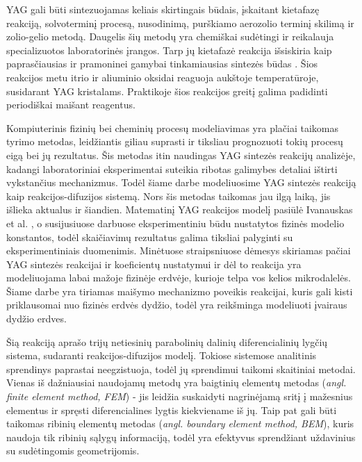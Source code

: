 \documentclass[]{VUMIFTemplateClass}
\begin{document}
YAG gali būti sintezuojamas keliais skirtingais būdais, įskaitant kietafazę reakciją, solvoterminį procesą, nusodinimą, purškiamo aerozolio terminį skilimą ir zolio-gelio metodą. Daugelis šių metodų yra chemiškai sudėtingi ir reikalauja specializuotos laboratorinės įrangos. Tarp jų kietafazė reakcija išsiskiria kaip paprasčiausias ir pramoninei gamybai tinkamiausias sintezės būdas \cite{zhangNovelSynthesisYAG2005}. Šios reakcijos metu itrio ir aliuminio oksidai reaguoja aukštoje temperatūroje, susidarant YAG kristalams. Praktikoje šios reakcijos greitį galima padidinti periodiškai maišant reagentus.

Kompiuterinis fizinių bei cheminių procesų modeliavimas yra plačiai taikomas tyrimo metodas, leidžiantis giliau suprasti ir tiksliau prognozuoti tokių procesų eigą bei jų rezultatus. Šis metodas itin naudingas YAG sintezės reakcijų analizėje, kadangi laboratoriniai eksperimentai suteikia ribotas galimybes detaliai ištirti vykstančius mechanizmus. Todėl šiame darbe modeliuosime YAG sintezės reakciją kaip reakcijos-difuzijos sistemą. Nors šis metodas taikomas jau ilgą laiką, jis išlieka aktualus ir šiandien. Matematinį YAG reakcijos modelį pasiūlė Ivanauskas et al. \cite{ivanauskasModellingSolidState2005}, o susijusiuose darbuose \cite{ivanauskasComputationalModellingYAG2009,mackeviciusCloserLookComputer2012} eksperimentiniu būdu nustatytos fizinės modelio konstantos, todėl skaičiavimų rezultatus galima tiksliai palyginti su eksperimentiniais duomenimis. Minėtuose straipsniuose dėmesys skiriamas pačiai YAG sintezės reakcijai ir koeficientų nustatymui ir dėl to reakcija yra modeliuojama labai mažoje fizinėje erdvėje, kurioje telpa vos kelios mikrodalelės. Šiame darbe yra tiriamas maišymo mechanizmo poveikis reakcijai, kuris gali kisti priklausomai nuo fizinės erdvės dydžio, todėl yra reikšminga modeliuoti įvairaus dydžio erdves.

Šią reakciją aprašo trijų netiesinių parabolinių dalinių diferencialinių lygčių sistema, sudaranti reakcijos-difuzijos modelį. Tokiose sistemose analitinis sprendinys paprastai neegzistuoja, todėl jų sprendimui taikomi skaitiniai metodai. Vienas iš dažniausiai naudojamų metodų yra baigtinių elementų metodas (\textit{angl. finite element method, FEM}) - jis leidžia suskaidyti nagrinėjamą sritį į mažesnius elementus ir spręsti diferencialines lygtis kiekviename iš jų. Taip pat gali būti taikomas ribinių elementų metodas (\textit{angl. boundary element method, BEM}), kuris naudoja tik ribinių sąlygų informaciją, todėl yra efektyvus sprendžiant uždavinius su sudėtingomis geometrijomis.
\end{document}
